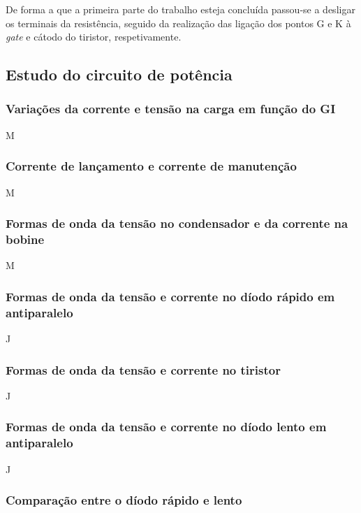 \documentclass[a4paper,11pt]{article}
\numberwithin{equation}{section}
\begin{document}
De forma a que a primeira parte do trabalho esteja concluída passou-se a desligar os terminais da resistência, seguido da realização das ligação dos pontos G e K à \textit{gate} e cátodo do tiristor, respetivamente.

\subsection{Estudo do circuito de potência}

\subsubsection{Variações da corrente e tensão na carga em função do GI}

M


\subsubsection{Corrente de lançamento e corrente de manutenção}

M

\subsubsection{Formas de onda da tensão no condensador e da corrente na bobine}

M

\subsubsection{Formas de onda da tensão e corrente no díodo rápido em antiparalelo}

J

\subsubsection{Formas de onda da tensão e corrente no tiristor}

J

\subsubsection{Formas de onda da tensão e corrente no díodo lento em antiparalelo}

J

\subsubsection{Comparação entre o díodo rápido e lento}
\end{document}
